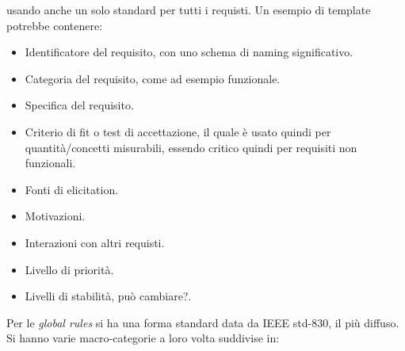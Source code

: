 usando anche un solo standard per tutti i requisti. Un esempio di template
potrebbe contenere:
\begin{itemize}
      \item Identificatore del requisito, con uno schema di naming significativo.
      \item Categoria del requisito, come ad esempio funzionale.
      \item Specifica del requisito.
      \item Criterio di fit o test di accettazione, il quale è usato quindi per
            quantità/concetti misurabili, essendo critico quindi per requisiti
            non funzionali.
      \item Fonti di elicitation.
      \item Motivazioni.
      \item Interazioni con altri requisti.
      \item Livello di priorità.
      \item Livelli di stabilità, può cambiare?.
\end{itemize}
Per le \textit{global rules} si ha una forma standard data da IEEE std-830, il
più diffuso. Si hanno varie macro-categorie a loro volta suddivise in:
